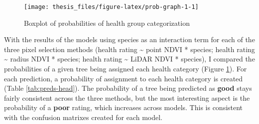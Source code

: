 \documentclass[12pt,twoside]{reedthesis}
\begin{document}
\begin{figure}

{\centering \texttt{[image: thesis\_files/figure-latex/prob-graph-1-1]} 

}

\caption{Boxplot of probabilities of health group categorization}\label{fig:prob-graph-1}
\end{figure}
With the results of the models using species as an interaction term for
each of the three pixel selection methods (health rating \textasciitilde{} point NDVI
* species; health rating \textasciitilde{} radius NDVI * species; health rating \textasciitilde{}
LiDAR NDVI * species), I compared the probabilities of a given tree
being assigned each health category (Figure \ref{fig:prob-graph-1}).
For each prediction, a probability of assignment to each health category
is created (Table \ref{tab:preds-head}). The probability of a tree
being predicted as \textbf{good} stays fairly consistent across the three
methods, but the most interesting aspect is the probability of a
\textbf{poor} rating, which increases across models. This is consistent with
the confusion matrixes created for each model.
\end{document}

